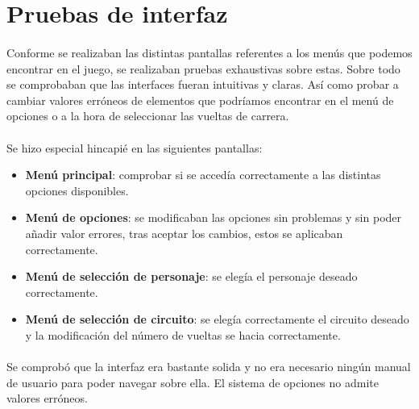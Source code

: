 \section{Pruebas de interfaz}

\paragraph{}
Conforme se realizaban las distintas pantallas referentes a los menús que podemos encontrar en el juego, se realizaban pruebas 
exhaustivas sobre estas. Sobre todo se comprobaban que las interfaces fueran intuitivas y claras. Así como probar a cambiar 
valores erróneos de elementos que podríamos encontrar en el menú de opciones o a la hora de seleccionar las vueltas de carrera.

\paragraph{}
Se hizo especial hincapié en las siguientes pantallas:

\begin{itemize}
    \item \textbf{Menú principal}: comprobar si se accedía correctamente a las distintas opciones disponibles.
    
    \item \textbf{Menú de opciones}: se modificaban las opciones sin problemas y sin poder añadir valor errores, tras aceptar
    los cambios, estos se aplicaban correctamente.
    
    \item \textbf{Menú de selección de personaje}: se elegía el personaje deseado correctamente.
    
    \item \textbf{Menú de selección de circuito}: se elegía correctamente el circuito deseado y la modificación del número de vueltas
    se hacia correctamente.
\end{itemize}

\paragraph{}
Se comprobó que la interfaz era bastante solida y no era necesario ningún manual de usuario para poder navegar sobre ella. El 
sistema de opciones no admite valores erróneos.
